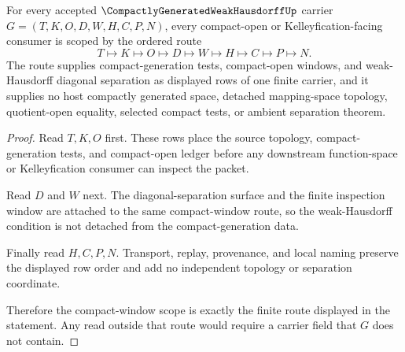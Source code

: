 \begin{theorem}
\label{thm:compactly-generated-weak-hausdorff-compact-window-scope}
For every accepted $\CompactlyGeneratedWeakHausdorffUp$ carrier $G=(T,K,O,D,W,H,C,P,N)$, every compact-open or Kelleyfication-facing consumer is scoped by the ordered route
$$
T \longmapsto K \longmapsto O \longmapsto D \longmapsto W \longmapsto H \longmapsto C \longmapsto P \longmapsto N .
$$
The route supplies compact-generation tests, compact-open windows, and weak-Hausdorff diagonal separation as displayed rows of one finite carrier, and it supplies no host compactly generated space, detached mapping-space topology, quotient-open equality, selected compact tests, or ambient separation theorem.
\end{theorem}
\begin{proof}
Read $T,K,O$ first. These rows place the source topology, compact-generation tests, and compact-open ledger before any downstream function-space or Kelleyfication consumer can inspect the packet.

Read $D$ and $W$ next. The diagonal-separation surface and the finite inspection window are attached to the same compact-window route, so the weak-Hausdorff condition is not detached from the compact-generation data.

Finally read $H,C,P,N$. Transport, replay, provenance, and local naming preserve the displayed row order and add no independent topology or separation coordinate.

Therefore the compact-window scope is exactly the finite route displayed in the statement. Any read outside that route would require a carrier field that $G$ does not contain.
\end{proof}


